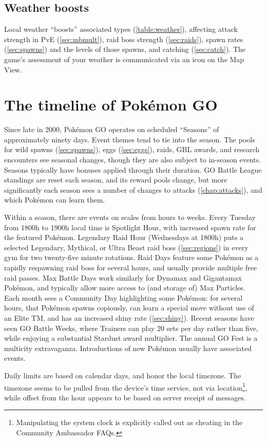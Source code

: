\subsection{Weather boosts\label{sec:weather}}
Local weather ``boosts'' associated types (\autoref{table:weather}),
  affecting attack strength in PvE (\autoref{sec:mbmult}),
  raid boss strength (\autoref{sec:raids}),
  spawn rates (\autoref{sec:spawns}) and the levels of those spawns,
  and catching (\autoref{sec:catch}).
The game's assessment of your weather is communicated via an icon on the Map View.
\begin{table}

\end{table}
\section{The timeline of Pokémon GO\label{sec:timeline}}
Since late in 2000, Pokémon GO operates on scheduled ``Seasons'' of approximately ninety days.
Event themes tend to tie into the season.
The pools for wild spawns (\autoref{sec:spawns}), eggs (\autoref{sec:eggs}), raids, GBL awards,
 and research encounters see seasonal changes, though they are also subject to in-season events.
Seasons typically have bonuses applied through their duration.
GO Battle League standings are reset each season, and its reward pools change, but
 more significantly each season sees a number of changes to attacks (\autoref{chap:attacks}),
 and which Pokémon can learn them.

Within a season, there are events on scales from hours to weeks.
Every Tuesday from 1800h to 1900h local time is Spotlight Hour, with
 increased spawn rate for the featured Pokémon.
Legendary Raid Hour (Wednesdays at 1800h) puts a selected Legendary, Mythical,
 or Ultra Beast raid boss (\autoref{sec:regions}) in every gym for two
 twenty-five minute rotations.
Raid Days feature some Pokémon as a rapidly respawning raid boss for several hours,
 and usually provide multiple free raid passes.
Max Battle Days work similarly for Dynamax and Gigantamax Pokémon, and typically
 allow more access to (and storage of) Max Particles.
Each month sees a Community Day highlighting some Pokémon: for several hours,
 that Pokémon spawns copiously, can learn a special move without use of an
 Elite TM, and has an increased shiny rate (\autoref{sec:shiny}).
Recent seasons have seen GO Battle Weeks, where Trainers can play 20 sets
 per day rather than five, while enjoying a substantial Stardust award multiplier.
The annual GO Fest is a multicity extravaganza.
Introductions of new Pokémon usually have associated events.

Daily limits are based on calendar days, and honor the local timezone.
The timezone seems to be pulled from the device's time service, not via location\footnote{Manipulating
 the system clock is explicitly called out as cheating in the Community Ambassador FAQs.},
 while offset from the hour appears to be based on server receipt of messages.
